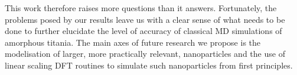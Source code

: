 \documentclass[aps,prb,twocolumn,amsmath,amssymb,superscriptaddress,longbibliography]{revtex4-1}
\newcommand\tab[1][1cm]{\hspace*{#1}} %
\begin{document}
\tab This work therefore raises more questions than it answers.
Fortunately, the problems posed by our results leave us with a clear sense of what needs to be done to further elucidate the level of accuracy of classical MD simulations of amorphous titania.
The main axes of future research we propose is the modelisation of larger, more practically relevant, nanoparticles and the use of linear scaling DFT routines to simulate such nanoparticles from first principles.




\end{document}
